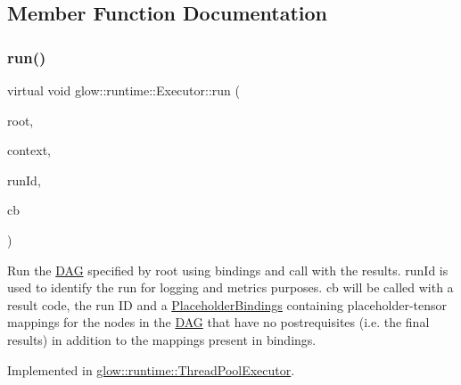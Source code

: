 \subsection{Member Function Documentation}
\mbox{\label{classglow_1_1runtime_1_1_executor_aeeef3270a1cdab1923bc75b02be16c07}} 
\subsubsection{\texorpdfstring{run()}{run()}}
{\footnotesize\ttfamily virtual void glow\+::runtime\+::\+Executor\+::run (\begin{DoxyParamCaption}\item[{const \hyperlink{structglow_1_1runtime_1_1_d_a_g_node}{D\+A\+G\+Node} $\ast$}]{root,  }\item[{std\+::unique\+\_\+ptr$<$ \hyperlink{classglow_1_1_execution_context}{Execution\+Context} $>$}]{context,  }\item[{Run\+Identifier\+Ty}]{run\+Id,  }\item[{Result\+C\+B\+Ty}]{cb }\end{DoxyParamCaption})\hspace{0.3cm}{\ttfamily [pure virtual]}}

Run the \hyperlink{structglow_1_1runtime_1_1_d_a_g}{D\+AG} specified by {\ttfamily root} using {\ttfamily bindings} and call  with the results. {\ttfamily run\+Id} is used to identify the run for logging and metrics purposes. cb will be called with a result code, the run ID and a \hyperlink{classglow_1_1_placeholder_bindings}{Placeholder\+Bindings} containing placeholder-\/tensor mappings for the nodes in the \hyperlink{structglow_1_1runtime_1_1_d_a_g}{D\+AG} that have no postrequisites (i.\+e. the final results) in addition to the mappings present in {\ttfamily bindings}. 

Implemented in \hyperlink{classglow_1_1runtime_1_1_thread_pool_executor_a2f0225f88e53cf550e98db5b5037449e}{glow\+::runtime\+::\+Thread\+Pool\+Executor}.

\mbox{\label{classglow_1_1runtime_1_1_executor_a2cbbc3a3fef585aed34aba34def2318a}} 
